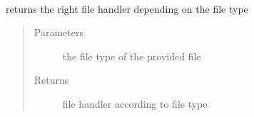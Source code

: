 \documentclass[letterpaper,10pt,english]{sphinxmanual}
\begin{document}
\begin{fulllineitems}
\label{\detokenize{eventLogConverter:eventLogConverter.defaultFileHandlersFactory.FileConverterFactory}}~

\begin{fulllineitems}
\label{\detokenize{eventLogConverter:eventLogConverter.defaultFileHandlersFactory.FileConverterFactory.create}}
returns the right file handler depending on the file type
\begin{quote}\begin{description}
\item[{Parameters}] \leavevmode
{} \textendash{} the file type of the provided file

\item[{Returns}] \leavevmode
file handler according to file type

\end{description}\end{quote}

\end{fulllineitems}


\end{fulllineitems}

\end{document}
